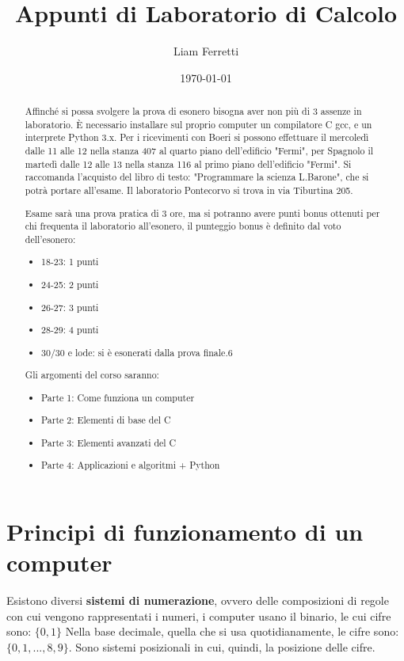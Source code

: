 \documentclass[a4paper,12pt]{article}
\title{Appunti di Laboratorio di Calcolo}
\author{Liam Ferretti}
\date{\today}
\begin{document}
	
	\maketitle
	
	\begin{abstract}
		Affinché si possa svolgere la prova di esonero bisogna aver non più di 3 assenze in laboratorio.
		È necessario installare sul proprio computer un compilatore C gcc, e un interprete Python 3.x.
		Per i ricevimenti con Boeri si possono effettuare il mercoledì dalle 11 alle 12 nella stanza 407 al quarto piano dell'edificio "Fermi", per Spagnolo il martedì dalle 12 alle 13 nella stanza 116 al primo piano dell'edificio "Fermi".
		Si raccomanda l'acquisto del libro di testo: "Programmare la scienza L.Barone", che si potrà portare all'esame.
		Il laboratorio Pontecorvo si trova in via Tiburtina 205.
		
		Esame sarà una prova pratica di 3 ore, ma si potranno avere punti bonus ottenuti per chi frequenta il laboratorio all'esonero, il punteggio bonus è definito dal voto dell'esonero:
		\begin{itemize}
			\item 18-23: 1 punti
			\item 24-25: 2 punti
			\item 26-27: 3 punti
			\item 28-29: 4 punti
			\item 30/30 e lode: si è esonerati dalla prova finale.6
		\end{itemize}
		Gli argomenti del corso saranno:
		\begin{itemize}
			\item Parte 1: Come funziona un computer
			\item Parte 2: Elementi di base del C
			\item Parte 3: Elementi avanzati del C
			\item Parte 4: Applicazioni e algoritmi + Python
		\end{itemize}
	\end{abstract}
	
	\newpage
	\tableofcontents
	\clearpage
	
	\section{Principi di funzionamento di un computer}
	Esistono diversi \textbf{sistemi di numerazione}, ovvero delle composizioni di regole con cui vengono rappresentati i numeri, i computer usano il binario, le cui cifre sono: $\{0, 1\}$
	Nella base decimale, quella che si usa quotidianamente, le cifre sono: $\{0, 1, ..., 8, 9\}$.
	Sono sistemi posizionali in cui, quindi, la posizione delle cifre.
	
\end{document}
